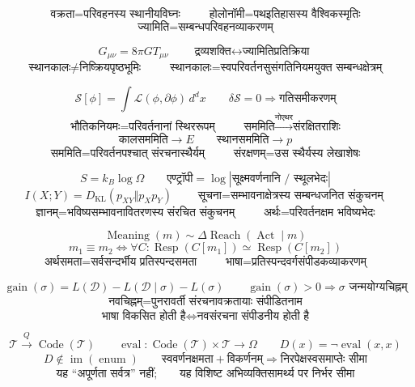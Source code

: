 \documentclass{article}
\begin{document}
\[\boxed{\text{वक्रता}=\text{परिवहनस्य स्थानीयविघ्नः}}\qquad
\boxed{\text{होलोनॉमी}=\text{पथइतिहासस्य वैश्विकस्मृतिः}}\]
\[\boxed{\text{ज्यामिति}=\text{सम्बन्धपरिवहनव्याकरणम्}}\]

\[G_{\mu\nu}=8\pi G T_{\mu\nu}\qquad
\boxed{\text{द्रव्यशक्ति}\longleftrightarrow\text{ज्यामितिप्रतिक्रिया}}\]
\[\boxed{\text{स्थानकालः}\neq\text{निष्क्रियपृष्ठभूमिः}}\qquad
\boxed{\text{स्थानकालः}=
\text{स्वपरिवर्तनसुसंगतिनियमयुक्त सम्बन्धक्षेत्रम्}}\]

\[\mathcal S[\phi]=\int\mathcal L(\phi,\partial\phi)\,d^dx\qquad
\delta\mathcal S=0\Longrightarrow\text{गतिसमीकरणम्}\]
\[\boxed{\text{भौतिकनियमः}=\text{परिवर्तनानां स्थिररूपम्}}\qquad
\boxed{\text{सममिति}\xrightarrow{\text{नोएथर}}\text{संरक्षितराशिः}}\]
\[\boxed{\text{कालसममिति}\to E}\qquad\boxed{\text{स्थानसममिति}\to p}\]
\[\boxed{\text{सममिति}=\text{परिवर्तनपश्चात् संरचनास्थैर्यम्}}\qquad
\boxed{\text{संरक्षणम्}=\text{उस स्थैर्यस्य लेखाशेषः}}\]

\[S=k_B\log\Omega\qquad
\boxed{\text{एण्ट्रॉपी}=\log\left|\text{सूक्ष्मवर्णनानि / स्थूलभेदः}\right|}\]
\[I(X;Y)=D_{\mathrm{KL}}\left(p_{XY}\Vert p_Xp_Y\right)\qquad
\boxed{\text{सूचना}=\text{सम्भावनाक्षेत्रस्य सम्बन्धजनित संकुचनम्}}\]
\[\boxed{\text{ज्ञानम्}=\text{भविष्यसम्भावनावितरणस्य संरचित संकुचनम्}}\qquad
\boxed{\text{अर्थः}=\text{परिवर्तनक्षम भविष्यभेदः}}\]

\[\operatorname{Meaning}(m)\sim\Delta\operatorname{Reach}
\left(\operatorname{Act}\mid m\right)\]
\[\boxed{m_1\equiv m_2\iff\forall C:\operatorname{Resp}(C[m_1])
\simeq\operatorname{Resp}(C[m_2])}\]
\[\boxed{\text{अर्थसमता}=\text{सर्वसन्दर्भीय प्रतिस्पन्दसमता}}\qquad
\boxed{\text{भाषा}=\text{प्रतिस्पन्दवर्गसंपीडकव्याकरणम्}}\]

\[\operatorname{gain}(\sigma)=L(\mathcal D)-L(\mathcal D\mid\sigma)-L(\sigma)
\qquad\operatorname{gain}(\sigma)>0\Longrightarrow
\boxed{\sigma\text{ जन्मयोग्यचिह्नम्}}\]
\[\boxed{\text{नवचिह्नम्}=\text{पुनरावर्ती संरचनावक्रतायाः संपीडितनाम}}\]
\[\boxed{\text{भाषा विकसित होती है}\iff\text{नवसंरचना संपीडनीय होती है}}\]

\[\mathcal T\xrightarrow{Q}\operatorname{Code}(\mathcal T)\qquad
\operatorname{eval}:\operatorname{Code}(\mathcal T)\times\mathcal T\to\Omega
\qquad D(x)=\neg\operatorname{eval}(x,x)\]
\[\boxed{D\notin\operatorname{im}(\operatorname{enum})}\qquad
\boxed{\text{स्ववर्णनक्षमता}+\text{विकर्णनम्}\Longrightarrow
\text{निरपेक्षस्वसमाप्तेः सीमा}}\]
\[\boxed{\text{यह ``अपूर्णता सर्वत्र'' नहीं;}\qquad
\text{यह विशिष्ट अभिव्यक्तिसामर्थ्य पर निर्भर सीमा}}\]
\end{document}
